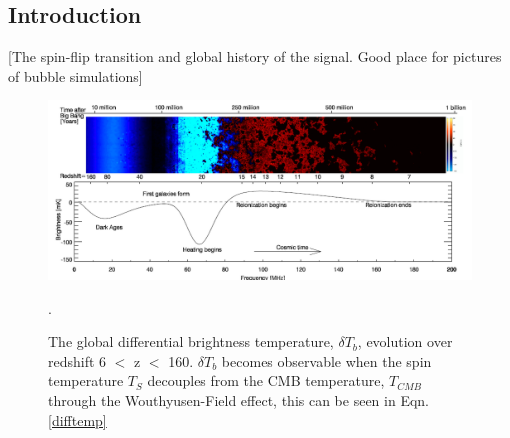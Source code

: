 \documentclass[a0,landscape]{a0poster}
\begin{document}
\begin{multicols}{4}
\begin{abstract}

\end{abstract}


\color{SaddleBrown} %

\section*{Introduction}

[The spin-flip transition and global history of the signal. Good place for pictures of bubble simulations]



\begin{figure}[H]
\centering
\includegraphics[width=1.0\linewidth]{figures/global_history.png}
\caption{The global differential brightness temperature, $\delta T_b$, evolution over redshift 6 $<$ z $<$ 160. $\delta T_b$ becomes observable when 
the spin temperature $T_S$ decouples from the CMB temperature, $T_{CMB}$ through the Wouthyusen-Field effect, this can be seen in 
Eqn. \ref{difftemp}}.
\end{figure}



\end{multicols}
\end{document}

